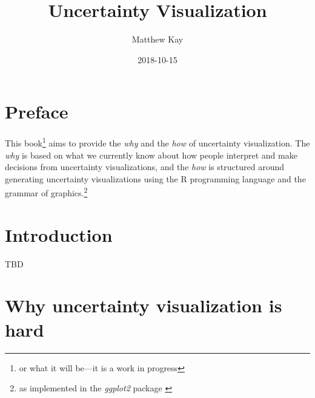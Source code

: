 \documentclass[]{book}
\title{Uncertainty Visualization}
\author{Matthew Kay}
\date{2018-10-15}
\let\rmarkdownfootnote\footnote%
\def\footnote{\protect\rmarkdownfootnote}
\theoremstyle{definition}
\theoremstyle{definition}
\theoremstyle{definition}
\theoremstyle{remark}
\begin{document}
\maketitle

{
\setcounter{tocdepth}{1}
\tableofcontents
}
\chapter*{Preface}\label{preface}

This book\footnote{or what it will be---it is a work in progress} aims
to provide the \emph{why} and the \emph{how} of uncertainty
visualization. The \emph{why} is based on what we currently know about
how people interpret and make decisions from uncertainty visualizations,
and the \emph{how} is structured around generating uncertainty
visualizations using the R programming language and the grammar of
graphics.\footnote{as implemented in the \emph{ggplot2} package
  \citep{R-ggplot2}}

\chapter{Introduction}\label{ch-intro}

TBD

\chapter{Why uncertainty visualization is hard}\label{ch-why-hard}
\end{document}
